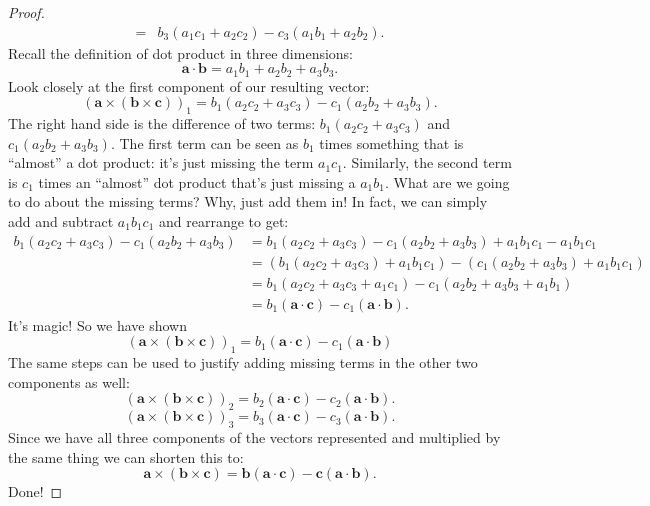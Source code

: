 \begin{proof}
\begin{align*}
=& b_3 \left(a_1 c_1 + a_2 c_2\right) - c_3 \left(a_1 b_1 + a_2 b_2 \right). 
\end{align*}
Recall the definition of dot product in three dimensions:
\[ \textbf{a} \cdot \textbf{b} = a_1 b_1 + a_2 b_2 + a_3 b_3. \]
Look closely at the first component of our resulting vector:
\[ \left(\textbf{a} \times (\textbf{b} \times \textbf{c}) \right)_1 =  b_1 \left(a_2 c_2 + a_3 c_3\right) - c_1 \left(a_2 b_2 + a_3 b_3 \right).\]
The right hand side is the difference of two terms:  $b_1 \left(a_2 c_2 + a_3 c_3\right)$ and   
$c_1 \left(a_2 b_2 + a_3 b_3 \right)$.  The first term can be seen as $b_1$ times something that is ``almost'' a dot product: it's just missing the term $a_1c_1$.  Similarly, the second term is $c_1$ times an ``almost'' dot product that's just missing a $a_1b_1$. What are we going to do about the missing terms?  Why, just add them in!  In fact, we can simply add and subtract $a_1b_1c_1$ and rearrange to get:
\begin{align*}
b_1 \left(a_2 c_2 + a_3 c_3\right) - c_1 \left(a_2 b_2 + a_3 b_3 \right) &=
b_1 \left(a_2 c_2 + a_3 c_3\right) - c_1 \left(a_2 b_2 + a_3 b_3 \right) + a_1b_1c_1 -  a_1b_1c_1 \\
& = (b_1 \left(a_2 c_2 + a_3 c_3\right)+ a_1b_1c_1) - (c_1 \left(a_2 b_2 + a_3 b_3 \right)  + a_1b_1c_1)\\
& = b_1 \left(a_2 c_2 + a_3 c_3+ a_1c_1\right) - c_1 \left(a_2 b_2 + a_3 b_3  + a_1b_1 \right) \\
&= b_1(\textbf{a} \cdot \textbf{c}) - c_1(\textbf{a} \cdot \textbf{b}).
\end{align*}
It's magic! So we have shown
\[ \left(\textbf{a} \times (\textbf{b} \times \textbf{c}) \right)_1 = b_1 \left(\textbf{a} \cdot \textbf{c}\right) - c_1 \left(\textbf{a} \cdot \textbf{b}\right) \]
The same steps can be used to justify adding missing terms in the other two components as well:
\[ \left(\textbf{a} \times (\textbf{b} \times \textbf{c}) \right)_2 = b_2 \left(\textbf{a} \cdot \textbf{c}\right) - c_2 \left(\textbf{a} \cdot \textbf{b}\right). \]
\[ \left(\textbf{a} \times (\textbf{b} \times \textbf{c}) \right)_3 = b_3 \left(\textbf{a} \cdot \textbf{c}\right) - c_3 \left(\textbf{a} \cdot \textbf{b}\right). \]
Since we have all three components of the vectors represented and multiplied by the same thing we can shorten this to:
\[ \textbf{a} \times \left( \textbf{b} \times \textbf{c} \right) = \textbf{b} \left( \textbf{a} \cdot \textbf{c} \right) - \textbf{c} \left( \textbf{a} \cdot \textbf{b} \right). \]
Done!
\end{proof}
\medskip

